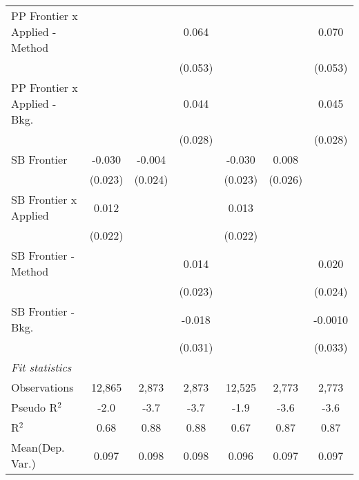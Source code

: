\begin{tabular}{lcccccc}
   PP Frontier x Applied - Method &                &              & 0.064       &                &              & 0.070\\   
                                  &                &              & (0.053)     &                &              & (0.053)\\   
   PP Frontier x Applied - Bkg.   &                &              & 0.044       &                &              & 0.045\\   
                                  &                &              & (0.028)     &                &              & (0.028)\\   
   SB Frontier                    & -0.030         & -0.004       &             & -0.030         & 0.008        &   \\   
                                  & (0.023)        & (0.024)      &             & (0.023)        & (0.026)      &   \\   
   SB Frontier x Applied          & 0.012          &              &             & 0.013          &              &   \\   
                                  & (0.022)        &              &             & (0.022)        &              &   \\   
   SB Frontier - Method           &                &              & 0.014       &                &              & 0.020\\   
                                  &                &              & (0.023)     &                &              & (0.024)\\   
   SB Frontier - Bkg.             &                &              & -0.018      &                &              & -0.0010\\   
                                  &                &              & (0.031)     &                &              & (0.033)\\   
   \midrule
   \emph{Fit statistics}\\
   Observations                   & 12,865         & 2,873        & 2,873       & 12,525         & 2,773        & 2,773\\  
   Pseudo R$^2$                   & -2.0           & -3.7         & -3.7        & -1.9           & -3.6         & -3.6\\  
   R$^2$                          & 0.68           & 0.88         & 0.88        & 0.67           & 0.87         & 0.87\\  
Mean(Dep. Var.) & 0.097 & 0.098 & 0.098 & 0.096 & 0.097 & 0.097 \\
   

\end{tabular}
